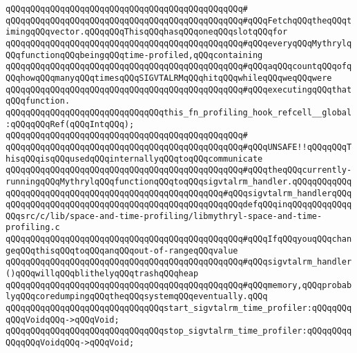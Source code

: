 \verb|qQQqqQQqqQQqqQQqqQQqqQQqqQQqqQQqqQQqqQQqqQQqqQQq#|\newline
\verb|qQQqqQQqqQQqqQQqqQQqqQQqqQQqqQQqqQQqqQQqqQQqqQQq#qQQqFetchqQQqtheqQQqtimingqQQqvector.qQQqqQQqThisqQQqhasqQQqoneqQQqslotqQQqfor|\newline
\verb|qQQqqQQqqQQqqQQqqQQqqQQqqQQqqQQqqQQqqQQqqQQqqQQq#qQQqeveryqQQqMythrylqQQqfunctionqQQqbeingqQQqtime-profiled,qQQqcontaining|\newline
\verb|qQQqqQQqqQQqqQQqqQQqqQQqqQQqqQQqqQQqqQQqqQQqqQQq#qQQqaqQQqcountqQQqofqQQqhowqQQqmanyqQQqtimesqQQqSIGVTALRMqQQqhitqQQqwhileqQQqweqQQqwere|\newline
\verb|qQQqqQQqqQQqqQQqqQQqqQQqqQQqqQQqqQQqqQQqqQQqqQQq#qQQqexecutingqQQqthatqQQqfunction.|\newline
\newline
\verb|qQQqqQQqqQQqqQQqqQQqqQQqqQQqqQQqthis_fn_profiling_hook_refcell__global:qQQqqQQqRef(qQQqIntqQQq);|\newline
\verb|qQQqqQQqqQQqqQQqqQQqqQQqqQQqqQQqqQQqqQQqqQQqqQQq#|\newline
\verb|qQQqqQQqqQQqqQQqqQQqqQQqqQQqqQQqqQQqqQQqqQQqqQQq#qQQqUNSAFE!!qQQqqQQqThisqQQqisqQQqusedqQQqinternallyqQQqtoqQQqcommunicate|\newline
\verb|qQQqqQQqqQQqqQQqqQQqqQQqqQQqqQQqqQQqqQQqqQQqqQQq#qQQqtheqQQqcurrently-runningqQQqMythrylqQQqfunctionqQQqtoqQQqsigvtalrm_handler.qQQqqQQqqQQqqQQqqQQqqQQqqQQqqQQqqQQqqQQqqQQqqQQqqQQqqQQq#qQQqsigvtalrm_handlerqQQqqQQqqQQqqQQqqQQqqQQqqQQqqQQqqQQqqQQqqQQqqQQqqQQqdefqQQqinqQQqqQQqqQQqqQQqsrc/c/lib/space-and-time-profiling/libmythryl-space-and-time-profiling.c|\newline
\verb|qQQqqQQqqQQqqQQqqQQqqQQqqQQqqQQqqQQqqQQqqQQqqQQq#qQQqIfqQQqyouqQQqchangeqQQqthisqQQqtoqQQqanqQQqout-of-rangeqQQqvalue|\newline
\verb|qQQqqQQqqQQqqQQqqQQqqQQqqQQqqQQqqQQqqQQqqQQqqQQq#qQQqsigvtalrm_handler()qQQqwillqQQqblithelyqQQqtrashqQQqheap|\newline
\verb|qQQqqQQqqQQqqQQqqQQqqQQqqQQqqQQqqQQqqQQqqQQqqQQq#qQQqmemory,qQQqprobablyqQQqcoredumpingqQQqtheqQQqsystemqQQqeventually.qQQq|\newline
\newline
\newline
\verb|qQQqqQQqqQQqqQQqqQQqqQQqqQQqqQQqstart_sigvtalrm_time_profiler:qQQqqQQqqQQqVoidqQQq->qQQqVoid;|\newline
\verb|qQQqqQQqqQQqqQQqqQQqqQQqqQQqqQQqstop_sigvtalrm_time_profiler:qQQqqQQqqQQqqQQqVoidqQQq->qQQqVoid;|\newline
